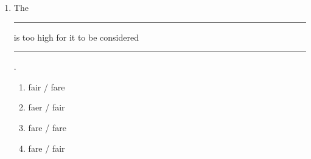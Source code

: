 \documentclass{article}
\begin{document}
\begin{enumerate}
    \item The \rule{1.5cm}{0.15mm} is too high for it to be considered \rule{1.5cm}{0.15mm}.
    \begin{enumerate}
        \item fair / fare
        \item faer / fair
        \item fare / fare
        \item fare / fair
    \end{enumerate}
\end{enumerate}
\end{document}
